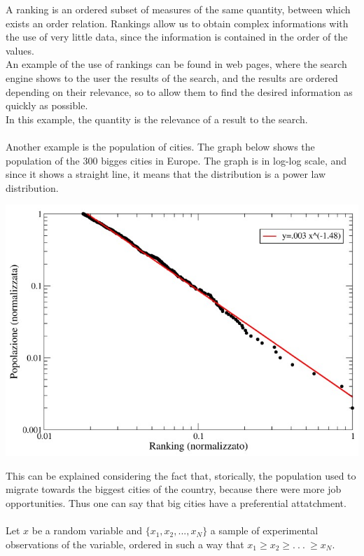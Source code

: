 A ranking is an ordered subset of measures of the same quantity, between which exists an order relation. Rankings allow us to obtain complex informations with the use of very little data, since the information is contained in the order of the values. \\ 
An example of the use of rankings can be found in web pages, where the search engine shows to the user the results of the search, and the results are ordered depending on their relevance, so to allow them to find the desired information as quickly as possible. \\
In this example, the quantity is the relevance of a result to the search. \\ \\
Another example is the population of cities. The graph below shows the population of the 300 bigges cities in Europe. The graph is in log-log scale, and since it shows a straight line, it means that the distribution is a power law distribution. \\
\begin{center}
	\includegraphics[scale=0.65]{cities_ranking.jpg}
\end{center}
This can be explained considering the fact that, storically, the population used to migrate towards the biggest cities of the country, because there were more job opportunities. Thus one can say that big cities have a preferential attatchment. \\ \\ 
Let $x$ be a random variable and $\{x_1,x_2, . . . , x_N\}$ a sample of experimental observations of the variable, ordered in such a way that $x_1 \geq x_2 \geq . \ . \ . \ \geq x_N$. \\ 
